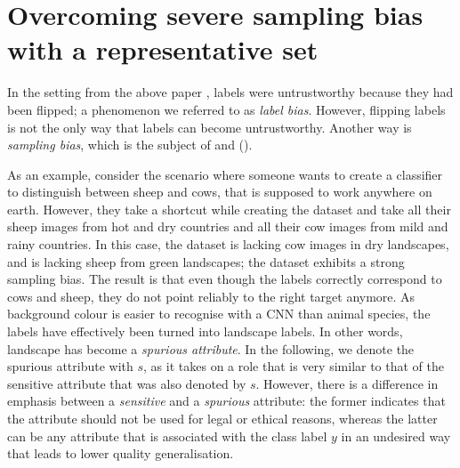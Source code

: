 \section{Overcoming severe sampling bias with a representative set}\label{sec:nifr}
In the setting from the above paper \citep{kehrenberg2020tuning},
labels were untrustworthy because they had been flipped;
a phenomenon we referred to as \emph{label bias}.
However, flipping labels is not the only way that labels can become untrustworthy.
Another way is \emph{sampling bias}, which is the subject of \citet{kehrenberg2020nullsampling} and \citet{kehrenberg2020zeroshot} ().

As an example, consider the scenario where someone wants to create a classifier
to distinguish between sheep and cows, that is supposed to work anywhere on earth.
However, they take a shortcut while creating the dataset
and take all their sheep images from hot and dry countries
and all their cow images from mild and rainy countries.
In this case, the dataset is lacking cow images in dry landscapes,
and is lacking sheep from green landscapes;
the dataset exhibits a strong sampling bias.
The result is that even though the labels correctly correspond to cows and sheep,
they do not point reliably to the right target anymore.
As background colour is easier to recognise with a \ac{CNN} than animal species,
the labels have effectively been turned into landscape labels.
In other words, landscape has become a \emph{spurious attribute}.
%
In the following, we denote the spurious attribute with \(s\),
as it takes on a role that is very similar to that of the sensitive attribute that was also denoted by \(s\).
However, there is a difference in emphasis between a \emph{sensitive} and a \emph{spurious} attribute:
the former indicates that the attribute should not be used for legal or ethical reasons,
whereas the latter can be any attribute that is associated with the class label \(y\) in an undesired way
that leads to lower quality generalisation.

